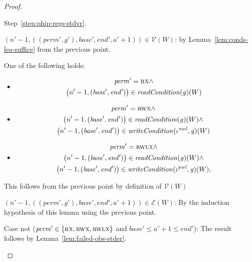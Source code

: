 \documentclass[a4paper]{article}
\newcommand{\var}[1]{\mathit{#1}}
\newcommand{\gl}{\var{g}}
\newcommand{\addr}{\var{a}}
\newcommand{\start}{\var{base}}
\newcommand{\addrend}{\var{end}}
\newcommand{\perm}{\var{perm}}
\newcommand{\nwl}{\var{nwl}}
\newcommand{\pwl}{\var{pwl}}
\newcommand{\plainfun}[2]{
  \ifthenelse{\equal{#2}{}}
  {\mathit{#1}}
  {\mathit{#1}(#2)}
}
\newcommand{\readCond}[1]{\plainfun{readCondition}{#1}}
\newcommand{\writeCond}[1]{\plainfun{writeCondition}{#1}}
\newcommand{\asmType}{\plaindom{AsmType}}
\newcommand{\plaindom}[1]{\mathrm{#1}}
\newcommand{\intr}[2]{\mathcal{#1}}
\newcommand{\valueintr}[1]{\intr{V}{#1}}
\newcommand{\exprintr}[1]{\intr{E}{#1}}
\newcommand{\stdvr}{\valueintr{\asmType}}
\newcommand{\stder}{\exprintr{\asmType}}
\newcommand{\npair}[2][n]{\left(#1,#2 \right)}
\newcommand{\plainperm}[1]{\textsc{#1}}
\newcommand{\exec}{\plainperm{rx}}
\newcommand{\rwx}{\plainperm{rwx}}
\newcommand{\rwlx}{\plainperm{rwlx}}
\begin{document}
\begin{proof}
\begin{enumproof}
\begin{enumproof}
\begin{enumproof}
\begin{enumproof}
\begin{enumproof}
            Step~\ref{step:phip-regs-stdvr}.
          \item $\npair[n'-1]{((\perm',\gl'),\start',\addrend',\addr' + 1)} \in \stdvr(W)$: by
            Lemma~\ref{lem:conds-lea-suffice} from the previous point.
          \item One of the following holds:
            \begin{itemize}
            \item \[
                \begin{gathered}
                  \perm' = \exec \land\\
                  \npair[n'-1]{(\start',\addrend')} \in \readCond{}(\gl)(W)
                \end{gathered}
              \]
            \item \[
                \begin{gathered}
                  \perm' = \rwx \land \\
                  \npair[n'-1]{(\start',\addrend')} \in \readCond{}(\gl)(W) \land\\
                  \npair[n'-1]{(\start',\addrend')} \in \writeCond{}(\iota^\nwl,\gl)(W)
                \end{gathered}
              \]
            \item \[
                \begin{gathered}
                  \perm' = \rwlx \land\\
                  \npair[n'-1]{(\start',\addrend')} \in \readCond{}(\gl)(W) \land\\
                  \npair[n'-1]{(\start',\addrend')} \in \writeCond{}(\iota^\pwl,\gl)(W),
                \end{gathered}
              \]
            \end{itemize}
           This follows from the previous point by  definition of $\stdvr(W)$
         \item $\npair[n'-1]{((\perm',\gl'),\start',\addrend',\addr' + 1)} \in
           \stder(W)$: By the induction hypothesis of this lemma using the
           previous point.
          \end{enumproof}
        \item Case not ($\perm' \in \{\exec,\rwx,\rwlx\}$ and $\start'\leq
          \addr'+1\leq \addrend'$):
          The result follows by Lemma~\ref{lem:failed-obs-stder}.
        \end{enumproof}
      \end{enumproof}
    \item

\end{enumproof}
\end{enumproof}
\end{proof}
\end{document}
